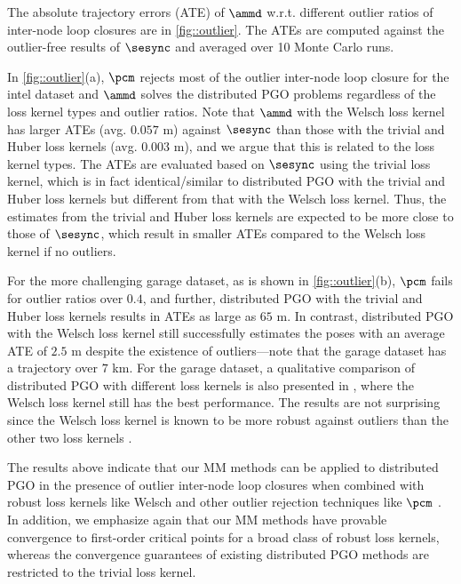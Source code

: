 The absolute trajectory errors (ATE)  of $\ammd$ w.r.t. different {\highlight outlier ratios} of inter-node loop closures are  in \cref{fig::outlier}. The ATEs are computed against the outlier-free results of $\sesync$ \cite{rosen2016se}  and  averaged over 10 Monte Carlo runs. 



In \cref{fig::outlier}(a), $\pcm$ \cite{mangelson2018pairwise} rejects most of the outlier inter-node loop closure for the {\sf intel} dataset and $\ammd$ solves the distributed PGO problems regardless of the loss kernel types and {\highlight outlier ratios}. Note that $\ammd$ with the Welsch loss kernel has larger ATEs (avg. $0.057$ m) against $\sesync$ \cite{rosen2016se} than those with the trivial and Huber loss kernels (avg. $0.003$ m), and we argue that this is related to the loss kernel types. The ATEs are evaluated based on $\sesync$ using the trivial loss kernel, which is in fact identical/similar to distributed PGO with the trivial and Huber loss kernels but different from that with the Welsch loss kernel. Thus, the estimates from the trivial and Huber loss kernels are expected to be more close to those of $\sesync$, which result in smaller ATEs compared to the Welsch loss kernel  if no outliers.

\figgarage

For the more challenging {\sf garage} dataset, as is shown in \cref{fig::outlier}(b), $\pcm$ fails for {\highlight outlier ratios} over $0.4$, and further, distributed PGO with the trivial and Huber loss kernels results in ATEs as large as $65$ m. In contrast, distributed PGO with the Welsch loss kernel still successfully estimates the poses with an average ATE of $2.5$ m despite the existence of  outliers---note that the {\sf garage} dataset has a trajectory over $7$ km. For the {\sf garage} dataset, a qualitative comparison of distributed PGO with different loss kernels is also presented in , where the Welsch loss kernel still has the best performance. The results are not surprising since the Welsch loss kernel is known to be more robust against outliers than the other two loss kernels \cite{barron2019cvpr}.  



The results above indicate that our MM methods can be applied to distributed PGO in the presence of outlier inter-node loop closures when combined with robust loss kernels like Welsch and other outlier rejection techniques like $\pcm$ \cite{mangelson2018pairwise}. In addition, we emphasize again that our MM methods have provable convergence to first-order critical points for a broad class of robust loss kernels, whereas the convergence guarantees of existing distributed PGO methods \cite{choudhary2017distributed,tian2019distributed,tron2014distributed,eric2020geod} are restricted to the trivial loss kernel.